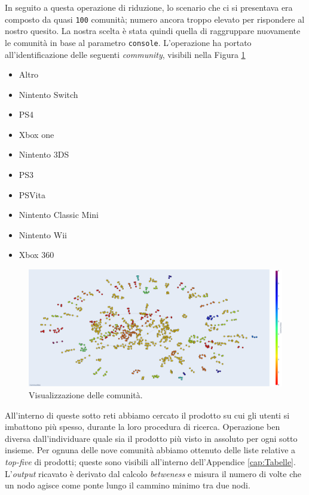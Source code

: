 			In seguito a questa operazione di riduzione, lo scenario che ci si presentava era composto da quasi \verb|100| comunità; numero ancora troppo elevato per rispondere al nostro quesito. La nostra scelta è stata quindi quella di raggruppare nuovamente le comunità in base al parametro \verb|console|. L'operazione ha portato all'identificazione delle seguenti \textit{community}, visibili nella Figura \ref{fig:communities}
			\begin{itemize}			
				\item Altro
				\item Nintento Switch
				\item PS4
				\item Xbox one
				\item Nintento 3DS
				\item PS3
				\item PSVita
				\item Nintento Classic Mini
				\item Nintento Wii
				\item Xbox 360
			\end{itemize}
		
			\begin{figure} [h]
				\includegraphics[width=\textwidth]{Figure/communities}
				\caption{Visualizzazione delle comunità.}
				\label{fig:communities}
			\end{figure} 
		
			All'interno di queste sotto reti abbiamo cercato il prodotto su cui gli utenti si imbattono più spesso, durante la loro procedura di ricerca. Operazione ben diversa dall'individuare quale sia il prodotto più visto in assoluto per ogni sotto insieme. Per ognuna delle nove comunità abbiamo ottenuto delle liste relative a \textit{top-five} di prodotti; queste sono visibili all'interno dell'Appendice \ref{cap:Tabelle}. L'\textit{output} ricavato è derivato dal calcolo \textit{betweness} e misura il numero di volte che un nodo agisce come ponte lungo il cammino minimo tra due nodi.
			